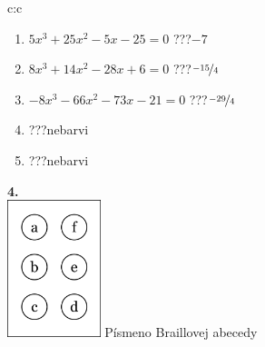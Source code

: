 \documentclass[10pt]{report}
\begin{document}
\begin{tabular}{c:c}
\begin{minipage}[c][104.5mm][t]{0.5\linewidth}
\begin{center}
\begin{minipage}{0.79\linewidth}
\begin{center}
\begin{varwidth}{\linewidth}
\begin{enumerate}
\item $5x^3+25x^2-5x-25=0$\quad \dotfill\; ???\;\dotfill \quad $-7$
\item $8x^3+14x^2-28x+6=0$\quad \dotfill\; ???\;\dotfill \quad $\nicefrac{-15}{4}$
\item $-8x^3-66x^2-73x-21=0$\quad \dotfill\; ???\;\dotfill \quad $\nicefrac{-29}{4}$
\item \quad \dotfill\; ???\;\dotfill \quad nebarvi
\item \quad \dotfill\; ???\;\dotfill \quad nebarvi
\end{enumerate}
\end{varwidth}
\end{center}
\end{minipage}
\begin{minipage}{0.20\linewidth}
\begin{center}
{\Huge\bfseries 4.} \\[2mm]
\includegraphics[height=40mm]{../images/braille.png}
{\small Písmeno Braillovej abecedy}
\end{center}
\end{minipage}
\end{center}
\end{minipage}
%
\end{tabular}
\newpage
\thispagestyle{empty}
\end{document}
